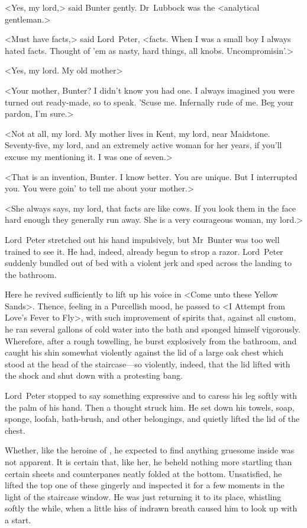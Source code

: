 <Yes, my lord,> said Bunter gently. Dr~Lubbock was the <analytical gentleman.>

<Must have facts,> said Lord~Peter, <facts. When I was a small boy I always hated facts. Thought of 'em as nasty, hard things, all knobs.  Uncompromisin'.>

<Yes, my lord. My old mother\longdash>

<Your mother, Bunter? I didn't know you had one. I always imagined you were turned out ready-made, so to speak. 'Scuse me. Infernally rude of me. Beg your pardon, I'm sure.>

<Not at all, my lord. My mother lives in Kent, my lord, near Maidstone.  Seventy-five, my lord, and an extremely active woman for her years, if you'll excuse my mentioning it. I was one of seven.>

<That is an invention, Bunter. I know better. You are unique. But I interrupted you. You were goin' to tell me about your mother.>

<She always says, my lord, that facts are like cows. If you look them in the face hard enough they generally run away. She is a very courageous woman, my lord.>

Lord~Peter stretched out his hand impulsively, but Mr~Bunter was too well trained to see it. He had, indeed, already begun to strop a razor.  Lord~Peter suddenly bundled out of bed with a violent jerk and sped
across the landing to the bathroom.

Here he revived sufficiently to lift up his voice in <Come unto these Yellow Sands>. Thence, feeling in a Purcellish mood, he passed to <I Attempt from Love's Fever to Fly>, with such improvement of spirits that, against all custom, he ran several gallons of cold water into the bath and sponged himself vigorously. Wherefore, after a rough towelling, he burst explosively from the bathroom, and caught his shin somewhat violently against the lid of a large oak chest which stood at the head of the staircase—so violently, indeed, that the lid lifted with the shock and shut down with a protesting bang.

Lord~Peter stopped to say something expressive and to caress his leg softly with the palm of his hand. Then a thought struck him. He set down his towels, soap, sponge, loofah, bath-brush, and other belongings, and quietly lifted the lid of the chest.

Whether, like the heroine of , he expected to find anything gruesome inside was not apparent. It is certain that, like her, he beheld nothing more startling than certain sheets and counterpanes neatly folded at the bottom. Unsatisfied, he lifted the top one of these gingerly and inspected it for a few moments in the light of the staircase window. He was just returning it to its place, whistling softly the while, when a little hiss of indrawn breath caused him to look up with a start.

